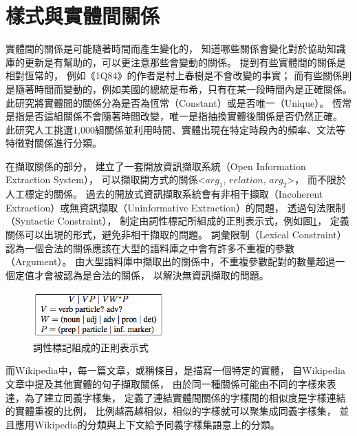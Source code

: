 
%
%
\section{樣式與實體間關係}

實體間的關係是可能隨著時間而產生變化的，
知道哪些關係會變化對於協助知識庫的更新是有幫助的，可以更注意那些會變動的關係。
\cite{relationsByTime} 提到有些實體間的關係是相對恆常的，
例如《1Q84》的作者是村上春樹是不會改變的事實；
而有些關係則是隨著時間而變動的，例如美國的總統是布希，只有在某一段時間內是正確關係。
此研究將實體間的關係分為是否為恆常（Constant）或是否唯一（Unique）。
恆常是指是否這組關係不會隨著時間改變，唯一是指抽換實體後關係是否仍然正確。
此研究人工挑選1,000組關係並利用時間、實體出現在特定時段內的頻率、文法等特徵對關係進行分類。

在擷取關係的部分，
\cite{reverb} 建立了一套開放資訊擷取系統（Open Information Extraction System），
可以擷取開方式的關係<$arg_1$, $relation$, $arg_2$>，
而不限於人工標定的關係。
過去的開放式資訊擷取系統會有非相干擷取（Incoherent Extraction）或無資訊擷取（Uninformative Extraction）的問題，
透過句法限制（Syntactic Constraint），
制定由詞性標記所組成的正則表示式，例如圖\ref{i:reverb-pos}，
定義關係可以出現的形式，避免非相干擷取的問題。
詞彙限制（Lexical Constraint）認為一個合法的關係應該在大型的語料庫之中會有許多不重複的參數（Argument）。
由大型語料庫中擷取出的關係中，不重複參數配對的數量超過一個定值才會被認為是合法的關係，
以解決無資訊擷取的問題。

\begin{figure}
    \centering
    \includegraphics[width=0.45\textwidth]{images/02-reverb-pos}
    \caption{詞性標記組成的正則表示式}
    \label{i:reverb-pos}
\end{figure}

而Wikipedia中，每一篇文章，或稱條目，是描寫一個特定的實體，
\cite{wisenet} 自Wikipedia文章中提及其他實體的句子擷取關係，
由於同一種關係可能由不同的字樣來表達，為了建立同義字樣集，
定義了連結實體間關係的字樣間的相似度是字樣連結的實體重複的比例，
比例越高越相似，相似的字樣就可以聚集成同義字樣集，
並且應用Wikipedia的分類與上下文給予同義字樣集語意上的分類。

